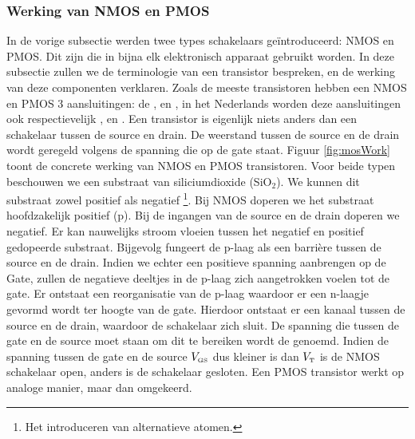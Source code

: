 \subsubsection{Werking van NMOS en PMOS}
\label{ss:nmosPmosWork}
In de vorige subsectie werden twee types schakelaars ge\"introduceerd: NMOS en PMOS. Dit zijn  die in bijna elk elektronisch apparaat gebruikt worden. In deze subsectie zullen we de terminologie van een transistor bespreken, en de werking van deze componenten verklaren. Zoals de meeste transistoren hebben een NMOS en PMOS 3 aansluitingen: de ,  en , in het Nederlands worden deze aansluitingen ook respectievelijk ,  en . Een transistor is eigenlijk niets anders dan een schakelaar tussen de source en drain. De weerstand tussen de source en de drain wordt geregeld volgens de spanning die op de gate staat. Figuur \ref{fig:mosWork} toont de concrete werking van NMOS en PMOS transistoren. Voor beide typen beschouwen we een substraat van siliciumdioxide (SiO$_2$). We kunnen dit substraat zowel positief als negatief \footnote{Het introduceren van alternatieve atomen.}. Bij NMOS doperen we het substraat hoofdzakelijk positief (p). Bij de ingangen van de source en de drain doperen we negatief. Er kan nauwelijks stroom vloeien tussen het negatief en positief gedopeerde substraat. Bijgevolg fungeert de p-laag als een barri\`ere tussen de source en de drain. Indien we echter een positieve spanning aanbrengen op de Gate, zullen de negatieve deeltjes in de p-laag zich aangetrokken voelen tot de gate. Er ontstaat een reorganisatie van de p-laag waardoor er een n-laagje gevormd wordt ter hoogte van de gate. Hierdoor ontstaat er een kanaal tussen de source en de drain, waardoor de schakelaar zich sluit. De spanning die tussen de gate en de source moet staan om dit te bereiken wordt de  genoemd. Indien de spanning tussen de gate en de source $V_{\mbox{\tiny GS}}$ dus kleiner is dan $V_{\mbox{\tiny T}}$ is de NMOS schakelaar open, anders is de schakelaar gesloten. Een PMOS transistor werkt op analoge manier, maar dan omgekeerd.

